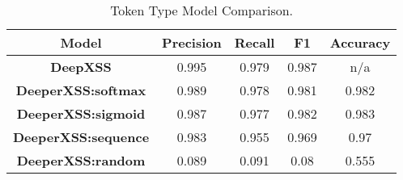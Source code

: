 \begin{table}
    \begin{center}
    \begingroup
    \setlength{\tabcolsep}{4pt} %
    \renewcommand{\arraystretch}{1.5} %
    \begin{tabular}{|| c | c | c | c | c ||} 
        \hline
        Model & Precision & Recall & F1 & Accuracy \\ 
        \hline\hline
        \textbf{DeepXSS} &  0.995 & 0.979 & 0.987 & n/a \\ 
        \hline
        \textbf{DeeperXSS:softmax} & 0.989 & 0.978 & 0.981 & 0.982 \\
        \hline
        \textbf{DeeperXSS:sigmoid} & 0.987 & 0.977 & 0.982 & 0.983 \\
        \hline
        \textbf{DeeperXSS:sequence} & 0.983 & 0.955 & 0.969 & 0.97 \\
        \hline
        \textbf{DeeperXSS:random} & 0.089 & 0.091 & 0.08 & 0.555 \\
        \hline
    \end{tabular}
    \endgroup
    \caption{\label{type:comparison}Token Type Model Comparison.}
    \end{center}
    \end{table}
